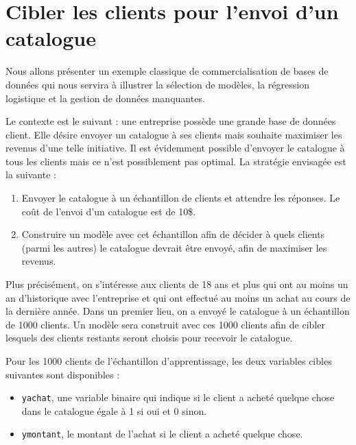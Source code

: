 \documentclass[
  11pt,
  letterpaper,
]{book}
\providecommand{\tightlist}{%
  \setlength{\itemsep}{0pt}\setlength{\parskip}{0pt}}
\theoremstyle{definition}
\theoremstyle{definition}
\theoremstyle{definition}
\theoremstyle{definition}
\theoremstyle{remark}
\begin{document}
\hypertarget{cibler-les-clients-pour-lenvoi-dun-catalogue}{%
\section{Cibler les clients pour l'envoi d'un catalogue}\label{cibler-les-clients-pour-lenvoi-dun-catalogue}}

Nous allons présenter un exemple classique de commercialisation de bases de données qui nous servira à illustrer la sélection de modèles, la régression logistique et la gestion de données manquantes.

Le contexte est le suivant : une entreprise possède une grande base de données client. Elle désire envoyer un catalogue à ses clients mais souhaite maximiser les revenus d'une telle initiative. Il est évidemment possible d'envoyer le catalogue à tous les clients mais ce n'est possiblement pas optimal. La stratégie envisagée est la suivante :

\begin{enumerate}
\def\labelenumi{\arabic{enumi}.}
\tightlist
\item
  Envoyer le catalogue à un échantillon de clients et attendre les réponses. Le coût de l'envoi d'un catalogue est de 10\$.
\item
  Construire un modèle avec cet échantillon afin de décider à quels clients (parmi les autres) le catalogue devrait être envoyé, afin de maximiser les revenus.
\end{enumerate}

Plus précisément, on s'intéresse aux clients de 18 ans et plus qui ont au moins un an d'historique avec l'entreprise et qui ont effectué au moins un achat au cours de la dernière année. Dans un premier lieu, on a envoyé le catalogue à un échantillon de 1000 clients. Un modèle sera construit avec ces 1000 clients afin de cibler lesquels des clients restants seront choisis pour recevoir le catalogue.

Pour les 1000 clients de l'échantillon d'apprentissage, les deux variables cibles suivantes sont disponibles :

\begin{itemize}
\tightlist
\item
  \texttt{yachat}, une variable binaire qui indique si le client a acheté quelque chose dans le catalogue égale à 1 si oui et 0 sinon.
\item
  \texttt{ymontant}, le montant de l'achat si le client a acheté quelque chose.
\end{itemize}
\end{document}
